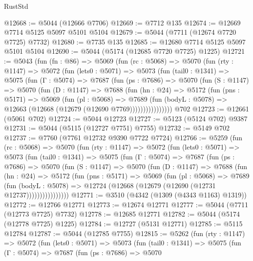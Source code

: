 \begin{lexlean}{RustStd}
\begin{coremodule}
@12668 := @5044 (@12666 @7706)
@12669 := @7712 @135
@12674 := @12669 @7714 @5125 @5097 @5101 @5104
@12679 := @5044 (@7711 (@12674 @7720 @7725) @7732)
@12680 := @7735 @135
@12685 := @12680 @7714 @5125 @5097 @5101 @5104
@12690 := @5044 (@5174 (@12685 @7720 @7725) @1225)
@12721 := @5043
    (fun (fn : @86) =>
    @5069
      (fun (rc : @5068) =>
      @5070
        (fun (rty : @1147) =>
        @5072
          (fun (lets0 : @5071) =>
          @5073
            (fun (tail0 : @1341) =>
            @5075
              (fun (Γ : @5074) =>
              @7687
                (fun (ps : @7686) =>
                @5070
                  (fun (S : @1147) =>
                  @5070
                    (fun (D : @1147) =>
                    @7688
                      (fun (hn : @24) =>
                      @5172
                        (fun (pns : @5171) =>
                        @5069
                          (fun (pl : @5068) =>
                          @7689
                            (fun (bodyL : @5078) =>
                            @12663 (@12668 (@12679 (@12690 @7769))))))))))))))))
    @702
@12723 := @12661 (@5061 @702)
@12724 := @5044 @12723
@12727 := @5123 (@5124 @702) @9387
@12731 := @5044 (@5115 (@12727 @7751) @7755)
@12732 := @5149 @702
@12737 := @7760 (@7761 @12732 @9390 @7722 @7724)
@12766 := @5259
    (fun (rc : @5068) =>
    @5070
      (fun (rty : @1147) =>
      @5072
        (fun (lets0 : @5071) =>
        @5073
          (fun (tail0 : @1341) =>
          @5075
            (fun (Γ : @5074) =>
            @7687
              (fun (ps : @7686) =>
              @5070
                (fun (S : @1147) =>
                @5070
                  (fun (D : @1147) =>
                  @7688
                    (fun (hn : @24) =>
                    @5172
                      (fun (pns : @5171) =>
                      @5069
                        (fun (pl : @5068) =>
                        @7689
                          (fun (bodyL : @5078) =>
                          @12724 (@12668 (@12679 (@12690 (@12731 @12737))))))))))))))))
@12771 := @3510 (@4342 (@1309 (@4343 @1163) @1319))
@12772 := @12766 @12771
@12773 := @12674 @12771
@12777 := @5044 (@7711 (@12773 @7725) @7732)
@12778 := @12685 @12771
@12782 := @5044 (@5174 (@12778 @7725) @1225)
@12784 := @12727 (@5131 @12771)
@12785 := @5115 @12784
@12787 := @5044 (@12785 @7755)
@12815 := @5262
    (fun (rty : @1147) =>
    @5072
      (fun (lets0 : @5071) =>
      @5073
        (fun (tail0 : @1341) =>
        @5075
          (fun (Γ : @5074) =>
          @7687
            (fun (ps : @7686) =>
            @5070

\end{coremodule}
\end{lexlean}
